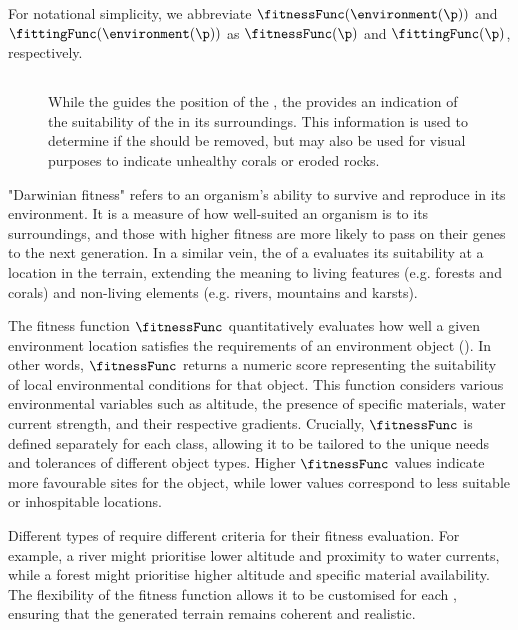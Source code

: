 For notational simplicity, we abbreviate $\fitnessFunc(\environment(\p))$ and $\fittingFunc(\environment(\p))$ as $\fitnessFunc(\p)$ and $\fittingFunc(\p)$, respectively.

\subsection{}

\begin{figure}
    \caption{While the  guides the position of the , the  provides an indication of the suitability of the  in its surroundings. This information is used to determine if the  should be removed, but may also be used for visual purposes to indicate unhealthy corals or eroded rocks.}
    \label{fig:env-obj-procedural-erosion}
\end{figure}

"Darwinian fitness" refers to an organism's ability to survive and reproduce in its environment. It is a measure of how well-suited an organism is to its surroundings, and those with higher fitness are more likely to pass on their genes to the next generation. In a similar vein, the  of a  evaluates its suitability at a location in the terrain, extending the meaning to living features (e.g. forests and corals) and non-living elements (e.g. rivers, mountains and karsts).

The fitness function $\fitnessFunc$ quantitatively evaluates how well a given environment location satisfies the requirements of an environment object (). In other words, $\fitnessFunc$ returns a numeric score representing the suitability of local environmental conditions for that object. This function considers various environmental variables such as altitude, the presence of specific materials, water current strength, and their respective gradients. Crucially, $\fitnessFunc$ is defined separately for each  class, allowing it to be tailored to the unique needs and tolerances of different object types. Higher $\fitnessFunc$ values indicate more favourable sites for the object, while lower values correspond to less suitable or inhospitable locations.

Different types of  require different criteria for their fitness evaluation. For example, a river might prioritise lower altitude and proximity to water currents, while a forest might prioritise higher altitude and specific material availability. The flexibility of the fitness function allows it to be customised for each , ensuring that the generated terrain remains coherent and realistic.

